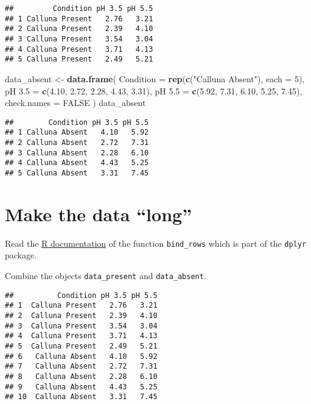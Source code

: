 \documentclass[
]{article}
\newenvironment{Shaded}{\begin{snugshade}}{\end{snugshade}}
\newcommand{\AttributeTok}[1]{\textcolor[rgb]{0.13,0.29,0.53}{#1}}
\newcommand{\ConstantTok}[1]{\textcolor[rgb]{0.56,0.35,0.01}{#1}}
\newcommand{\DecValTok}[1]{\textcolor[rgb]{0.00,0.00,0.81}{#1}}
\newcommand{\FloatTok}[1]{\textcolor[rgb]{0.00,0.00,0.81}{#1}}
\newcommand{\FunctionTok}[1]{\textcolor[rgb]{0.13,0.29,0.53}{\textbf{#1}}}
\newcommand{\NormalTok}[1]{#1}
\newcommand{\OtherTok}[1]{\textcolor[rgb]{0.56,0.35,0.01}{#1}}
\newcommand{\StringTok}[1]{\textcolor[rgb]{0.31,0.60,0.02}{#1}}
\begin{document}
\begin{verbatim}
##         Condition pH 3.5 pH 5.5
## 1 Calluna Present   2.76   3.21
## 2 Calluna Present   2.39   4.10
## 3 Calluna Present   3.54   3.04
## 4 Calluna Present   3.71   4.13
## 5 Calluna Present   2.49   5.21
\end{verbatim}

\begin{Shaded}
\begin{Highlighting}[]
\NormalTok{data\_absent }\OtherTok{\textless{}{-}} \FunctionTok{data.frame}\NormalTok{(}
  \AttributeTok{Condition =} \FunctionTok{rep}\NormalTok{(}\FunctionTok{c}\NormalTok{(}\StringTok{"Calluna Absent"}\NormalTok{), }\AttributeTok{each =} \DecValTok{5}\NormalTok{),}
  \StringTok{\textasciigrave{}}\AttributeTok{pH 3.5}\StringTok{\textasciigrave{}} \OtherTok{=} \FunctionTok{c}\NormalTok{(}\FloatTok{4.10}\NormalTok{, }\FloatTok{2.72}\NormalTok{, }\FloatTok{2.28}\NormalTok{, }\FloatTok{4.43}\NormalTok{, }\FloatTok{3.31}\NormalTok{),}
  \StringTok{\textasciigrave{}}\AttributeTok{pH 5.5}\StringTok{\textasciigrave{}} \OtherTok{=} \FunctionTok{c}\NormalTok{(}\FloatTok{5.92}\NormalTok{, }\FloatTok{7.31}\NormalTok{, }\FloatTok{6.10}\NormalTok{, }\FloatTok{5.25}\NormalTok{, }\FloatTok{7.45}\NormalTok{),}
  \AttributeTok{check.names =} \ConstantTok{FALSE}
\NormalTok{)}
\NormalTok{data\_absent}
\end{Highlighting}
\end{Shaded}

\begin{verbatim}
##        Condition pH 3.5 pH 5.5
## 1 Calluna Absent   4.10   5.92
## 2 Calluna Absent   2.72   7.31
## 3 Calluna Absent   2.28   6.10
## 4 Calluna Absent   4.43   5.25
## 5 Calluna Absent   3.31   7.45
\end{verbatim}

\hypertarget{make-the-data-long}{%
\section{Make the data ``long''}\label{make-the-data-long}}

Read the \href{https://dplyr.tidyverse.org/reference/bind_rows.html}{R
documentation} of the function \texttt{bind\_rows} which is part of the
\texttt{dplyr} package.

Combine the objects \texttt{data\_present} and \texttt{data\_absent}.

\begin{verbatim}
##          Condition pH 3.5 pH 5.5
## 1  Calluna Present   2.76   3.21
## 2  Calluna Present   2.39   4.10
## 3  Calluna Present   3.54   3.04
## 4  Calluna Present   3.71   4.13
## 5  Calluna Present   2.49   5.21
## 6   Calluna Absent   4.10   5.92
## 7   Calluna Absent   2.72   7.31
## 8   Calluna Absent   2.28   6.10
## 9   Calluna Absent   4.43   5.25
## 10  Calluna Absent   3.31   7.45
\end{verbatim}
\end{document}
